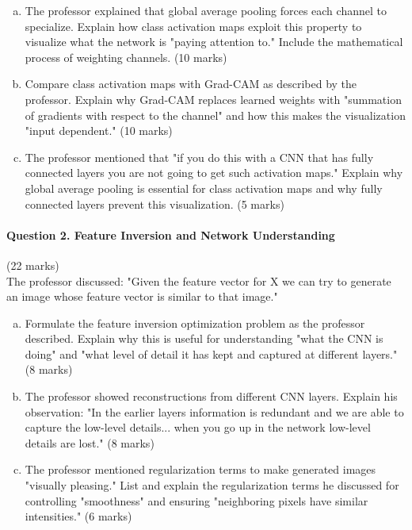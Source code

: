 \documentclass[12pt]{article}
\newcommand{\shortanswer}{\vspace{2cm}}
\newcommand{\mediumanswer}{\vspace{3cm}}
\begin{document}
\begin{enumerate}[(a)]
    \item The professor explained that global average pooling forces each channel to specialize. Explain how class activation maps exploit this property to visualize what the network is "paying attention to." Include the mathematical process of weighting channels. \hfill (10 marks)
    
    \mediumanswer
    
    \item Compare class activation maps with Grad-CAM as described by the professor. Explain why Grad-CAM replaces learned weights with "summation of gradients with respect to the channel" and how this makes the visualization "input dependent." \hfill (10 marks)
    
    \mediumanswer
    
    \item The professor mentioned that "if you do this with a CNN that has fully connected layers you are not going to get such activation maps." Explain why global average pooling is essential for class activation maps and why fully connected layers prevent this visualization. \hfill (5 marks)
    
    \shortanswer
\end{enumerate}

\newpage
\paragraph{Question 2. Feature Inversion and Network Understanding}{\hfill (22 marks)}\\
The professor discussed: "Given the feature vector for X we can try to generate an image whose feature vector is similar to that image."

\begin{enumerate}[(a)]
    \item Formulate the feature inversion optimization problem as the professor described. Explain why this is useful for understanding "what the CNN is doing" and "what level of detail it has kept and captured at different layers." \hfill (8 marks)
    
    \mediumanswer
    
    \item The professor showed reconstructions from different CNN layers. Explain his observation: "In the earlier layers information is redundant and we are able to capture the low-level details... when you go up in the network low-level details are lost." \hfill (8 marks)
    
    \mediumanswer
    
    \item The professor mentioned regularization terms to make generated images "visually pleasing." List and explain the regularization terms he discussed for controlling "smoothness" and ensuring "neighboring pixels have similar intensities." \hfill (6 marks)
    
    \shortanswer
\end{enumerate}
\end{document}
